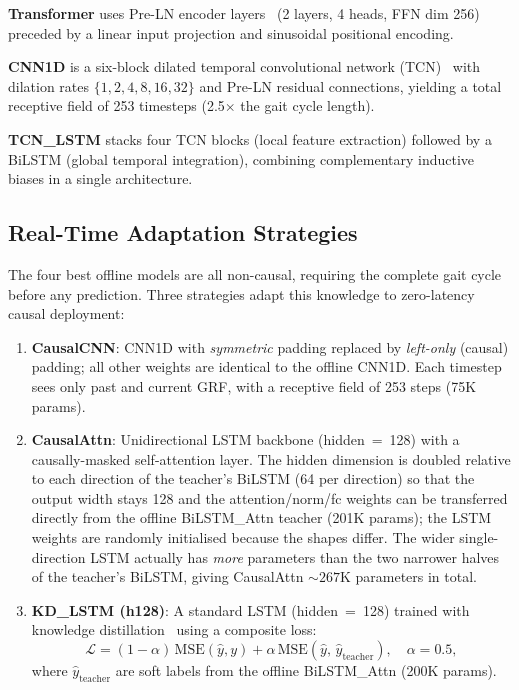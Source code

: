 \documentclass[preprint,12pt]{elsarticle}
\begin{document}
\noindent\textbf{Transformer} uses Pre-LN encoder layers~\cite{vaswani2017attention}
(2 layers, 4 heads, FFN dim 256) preceded by a linear input projection and
sinusoidal positional encoding.

\noindent\textbf{CNN1D} is a six-block dilated temporal convolutional network
(TCN)~\cite{bai2018empirical} with dilation rates $\{1, 2, 4, 8, 16, 32\}$ and
Pre-LN residual connections, yielding a total receptive field of 253 timesteps
(2.5$\times$ the gait cycle length).

\noindent\textbf{TCN\_LSTM} stacks four TCN blocks (local feature extraction)
followed by a BiLSTM (global temporal integration), combining complementary
inductive biases in a single architecture.

\subsection{Real-Time Adaptation Strategies}
\label{subsec:realtime}

The four best offline models are all non-causal, requiring the complete gait cycle
before any prediction.
Three strategies adapt this knowledge to zero-latency causal deployment:

\begin{enumerate}
  \item \textbf{CausalCNN}: CNN1D with \emph{symmetric} padding replaced by
        \emph{left-only} (causal) padding; all other weights are identical to the
        offline CNN1D.
        Each timestep sees only past and current GRF, with a receptive field of
        253 steps (75K params).
  \item \textbf{CausalAttn}: Unidirectional LSTM backbone (hidden~=~128) with a
        causally-masked self-attention layer.
        The hidden dimension is doubled relative to each direction of the teacher's
        BiLSTM (64 per direction) so that the output width stays 128 and the
        attention/norm/fc weights can be transferred directly from the offline
        BiLSTM\_Attn teacher (201K params); the LSTM weights are randomly initialised
        because the shapes differ.
        The wider single-direction LSTM actually has \emph{more} parameters than the
        two narrower halves of the teacher's BiLSTM, giving CausalAttn ${\sim}267$K
        parameters in total.
  \item \textbf{KD\_LSTM (h128)}: A standard LSTM (hidden~=~128) trained with
        knowledge distillation~\cite{hinton2015distilling} using a composite loss:
        \begin{equation}
          \mathcal{L} = (1-\alpha)\,\mathrm{MSE}(\hat{y}, y)
                       + \alpha\,\mathrm{MSE}(\hat{y},\,\hat{y}_\mathrm{teacher}),
                       \quad \alpha = 0.5,
        \end{equation}
        where $\hat{y}_\mathrm{teacher}$ are soft labels from the offline
        BiLSTM\_Attn (200K params).
\end{enumerate}
\end{document}

